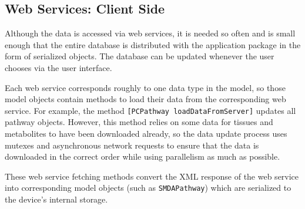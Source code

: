 \subsection{Web Services: Client Side}
\label{sect:smda_web_services_client}

Although the data is accessed via web services, it is needed so often and is
small enough that the entire database is distributed with the application
package in the form of serialized objects. The database can be updated whenever
the user chooses via the user interface.

Each web service corresponds roughly to one data type in the model, so those
model objects contain methods to load their data from the corresponding web
service. For example, the method \texttt{[PCPathway loadDataFromServer]}
updates all pathway objects. However, this method relies on some data for
tissues and metabolites to have been downloaded already, so the data update
process uses mutexes and asynchronous network requests to ensure that the data
is downloaded in the correct order while using parallelism as much as possible.

These web service fetching methods convert the XML response of the web service
into corresponding model objects (such as \texttt{SMDAPathway}) which are
serialized to the device's internal storage.
